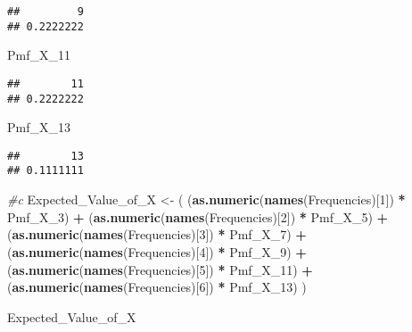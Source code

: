 \documentclass[
]{article}
\newenvironment{Shaded}{\begin{snugshade}}{\end{snugshade}}
\newcommand{\CommentTok}[1]{\textcolor[rgb]{0.56,0.35,0.01}{\textit{#1}}}
\newcommand{\DecValTok}[1]{\textcolor[rgb]{0.00,0.00,0.81}{#1}}
\newcommand{\FunctionTok}[1]{\textcolor[rgb]{0.13,0.29,0.53}{\textbf{#1}}}
\newcommand{\NormalTok}[1]{#1}
\newcommand{\OtherTok}[1]{\textcolor[rgb]{0.56,0.35,0.01}{#1}}
\newcommand{\SpecialCharTok}[1]{\textcolor[rgb]{0.81,0.36,0.00}{\textbf{#1}}}
\begin{document}
\begin{verbatim}
##         9 
## 0.2222222
\end{verbatim}

\begin{Shaded}
\begin{Highlighting}[]
\NormalTok{Pmf\_X\_11}
\end{Highlighting}
\end{Shaded}

\begin{verbatim}
##        11 
## 0.2222222
\end{verbatim}

\begin{Shaded}
\begin{Highlighting}[]
\NormalTok{Pmf\_X\_13}
\end{Highlighting}
\end{Shaded}

\begin{verbatim}
##        13 
## 0.1111111
\end{verbatim}

\begin{Shaded}
\begin{Highlighting}[]
\CommentTok{\#c}
\NormalTok{Expected\_Value\_of\_X }\OtherTok{\textless{}{-}}\NormalTok{ (}
\NormalTok{  (}\FunctionTok{as.numeric}\NormalTok{(}\FunctionTok{names}\NormalTok{(Frequencies)[}\DecValTok{1}\NormalTok{]) }\SpecialCharTok{*}\NormalTok{ Pmf\_X\_3) }\SpecialCharTok{+} 
\NormalTok{  (}\FunctionTok{as.numeric}\NormalTok{(}\FunctionTok{names}\NormalTok{(Frequencies)[}\DecValTok{2}\NormalTok{]) }\SpecialCharTok{*}\NormalTok{ Pmf\_X\_5) }\SpecialCharTok{+} 
\NormalTok{  (}\FunctionTok{as.numeric}\NormalTok{(}\FunctionTok{names}\NormalTok{(Frequencies)[}\DecValTok{3}\NormalTok{]) }\SpecialCharTok{*}\NormalTok{ Pmf\_X\_7) }\SpecialCharTok{+}
\NormalTok{  (}\FunctionTok{as.numeric}\NormalTok{(}\FunctionTok{names}\NormalTok{(Frequencies)[}\DecValTok{4}\NormalTok{]) }\SpecialCharTok{*}\NormalTok{ Pmf\_X\_9) }\SpecialCharTok{+} 
\NormalTok{  (}\FunctionTok{as.numeric}\NormalTok{(}\FunctionTok{names}\NormalTok{(Frequencies)[}\DecValTok{5}\NormalTok{]) }\SpecialCharTok{*}\NormalTok{ Pmf\_X\_11) }\SpecialCharTok{+} 
\NormalTok{  (}\FunctionTok{as.numeric}\NormalTok{(}\FunctionTok{names}\NormalTok{(Frequencies)[}\DecValTok{6}\NormalTok{]) }\SpecialCharTok{*}\NormalTok{ Pmf\_X\_13)}
\NormalTok{)}

\NormalTok{Expected\_Value\_of\_X}
\end{Highlighting}
\end{Shaded}
\end{document}

